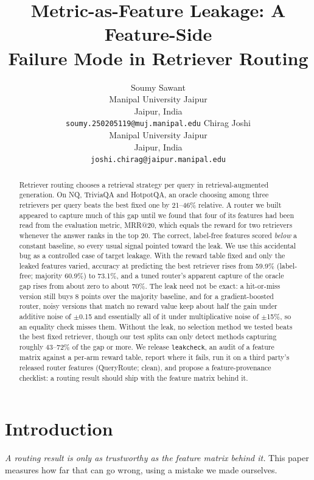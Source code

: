 \documentclass{article}
\title{Metric-as-Feature Leakage: A Feature-Side\\
       Failure Mode in Retriever Routing}
\author{
  Soumy Sawant\\
  Manipal University Jaipur\\
  Jaipur, India\\
  \texttt{soumy.250205119@muj.manipal.edu}
  \And
  Chirag Joshi\\
  Manipal University Jaipur\\
  Jaipur, India\\
  \texttt{joshi.chirag@jaipur.manipal.edu}
}
\begin{document}
\maketitle

\begin{abstract}
Retriever routing chooses a retrieval strategy per query in retrieval-augmented generation. On
NQ, TriviaQA and HotpotQA, an oracle choosing among three retrievers per query beats the best
fixed one by 21--46\% relative. A router we built appeared to capture much of this gap until we
found that four of its features had been read from the evaluation metric, MRR@20, which equals
the reward for two retrievers whenever the answer ranks in the top 20. The correct, label-free
features scored \emph{below} a constant baseline, so every usual signal pointed toward the leak.
We use this accidental bug as a controlled case of target leakage. With the reward table fixed
and only the leaked features varied, accuracy at predicting the best retriever rises from 59.9\%
(label-free; majority 60.9\%) to 73.1\%, and a tuned router's apparent capture of the oracle gap
rises from about zero to about 70\%. The leak need not be exact: a hit-or-miss version still buys
8 points over the majority baseline, and for a gradient-boosted router, noisy versions that match
no reward value keep about half the gain under additive noise of $\pm$0.15 and essentially all of
it under multiplicative noise of $\pm$15\%, so an equality check misses them. Without the leak, no
selection method we tested beats the best fixed retriever, though our test splits can only detect
methods capturing roughly 43--72\% of the gap or more. We release \texttt{leakcheck}, an audit of
a feature matrix against a per-arm reward table, report where it fails, run it on a third party's
released router features (QueryRoute; clean), and propose a feature-provenance checklist: a
routing result should ship with the feature matrix behind it.
\end{abstract}

\section{Introduction}
\label{sec:intro}

\emph{A routing result is only as trustworthy as the feature matrix behind it.} This paper
measures how far that can go wrong, using a mistake we made ourselves.
\end{document}
